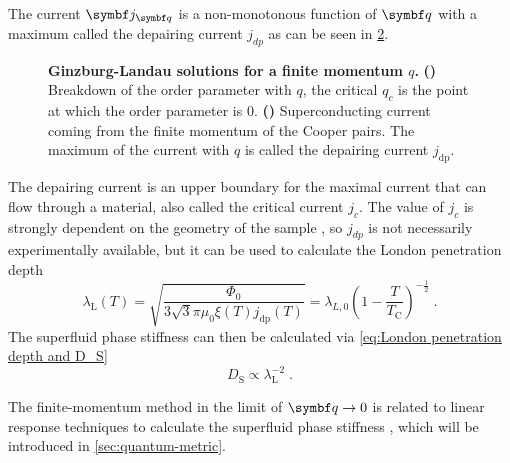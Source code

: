 \documentclass[../main.tex]{subfiles}
\begin{document}
The current \(\vb{j}_{\vb{q}}\) is a non-monotonous function of \(\vb{q}\) with a maximum called the depairing current \(j_{dp}\) as can be seen in \cref{sfig:Ginzburg Landau current vs q}.
\begin{figure}[t]
	\centering
	\begin{subfigure}[b]{0.49\textwidth}
		\centering
		\caption{\hfill\null}\label{sfig:Ginzburg Landau OP vs q}
		
	\end{subfigure}%
	\begin{subfigure}[b]{0.49\textwidth}
		\centering
		\caption{\hfill\null}\label{sfig:Ginzburg Landau current vs q}
		
	\end{subfigure}
	\caption[Ginzburg-Landau solutions for a finite momentum \(q\).]{\textbf{Ginzburg-Landau solutions for a finite momentum \(q\).} \textbf{()} Breakdown of the order parameter with \(q\), the critical \(q_c\) is the point at which the order parameter is 0. \textbf{()} Superconducting current coming from the finite momentum of the Cooper pairs. The maximum of the current with \(q\) is called the depairing current \(j_{\mathrm{dp}}\).}
	\label{fig:Ginzburg Landau OP and current vs q}
\end{figure}
The depairing current is an upper boundary for the maximal current that can flow through a material, also called the critical current \(j_c\).
The value of \(j_c\) is strongly dependent on the geometry of the sample \cite{bardeenCriticalFieldsCurrents1962, xuAchievingTheoreticalDepairing2010}, so \(j_{dp}\) is not necessarily experimentally available, but it can be used to calculate the London penetration depth \cite{tinkhamIntroductionSuperconductivity1996}
\begin{equation}
	\lambda_{\mathrm{L}} (T) = \sqrt{\frac{\Phi_0}{3 \sqrt{3} \pi \mu_0 \xi(T) j_{\mathrm{dp}} (T)}} = \lambda_{L,0} \left( 1 - \frac{T}{T_{\mathrm{C}}} \right)^{-\frac{1}{2}}\;.
	\label{eq:London penetration depth from current and temperature dependence}
\end{equation}
The superfluid phase stiffness can then be calculated via \cref{eq:London penetration depth and D_S}
\begin{equation}
	D_{\mathrm{S}} \propto \lambda_{\mathrm{L}}^{-2} \;.
\end{equation}

The finite-momentum method in the limit of \(\vb{q} \to 0\) is related to linear response techniques to calculate the superfluid phase stiffness \cite{peottaSuperfluidityTopologicallyNontrivial2015, liangBandGeometryBerry2017}, which will be introduced in \cref{sec:quantum-metric}.
\end{document}
